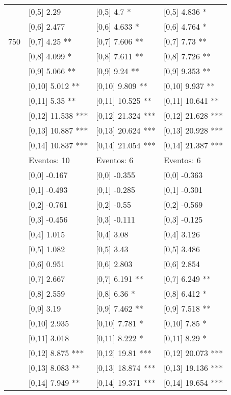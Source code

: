\begin{table}
\begin{tabular}[t]{llll}
 & {}[0,5] 2.29 & {}[0,5] 4.7 * & {}[0,5] 4.836 *\\
 & {}[0,6] 2.477 & {}[0,6] 4.633 * & {}[0,6] 4.764 *\\
750 & {}[0,7] 4.25 ** & {}[0,7] 7.606 ** & {}[0,7] 7.73 **\\
\addlinespace
 & {}[0,8] 4.099 * & {}[0,8] 7.611 ** & {}[0,8] 7.726 **\\
 & {}[0,9] 5.066 ** & {}[0,9] 9.24 ** & {}[0,9] 9.353 **\\
 & {}[0,10] 5.012 ** & {}[0,10] 9.809 ** & {}[0,10] 9.937 **\\
 & {}[0,11] 5.35 ** & {}[0,11] 10.525 ** & {}[0,11] 10.641 **\\
 & {}[0,12] 11.538 *** & {}[0,12] 21.324 *** & {}[0,12] 21.628 ***\\
\addlinespace
 & {}[0,13] 10.887 *** & {}[0,13] 20.624 *** & {}[0,13] 20.928 ***\\
 & {}[0,14] 10.837 *** & {}[0,14] 21.054 *** & {}[0,14] 21.387 ***\\
 & Eventos:  10 & Eventos:  6 & Eventos:  6\\
 & {}[0,0] -0.167 & {}[0,0] -0.355 & {}[0,0] -0.363\\
 & {}[0,1] -0.493 & {}[0,1] -0.285 & {}[0,1] -0.301\\
\addlinespace
 & {}[0,2] -0.761 & {}[0,2] -0.55 & {}[0,2] -0.569\\
 & {}[0,3] -0.456 & {}[0,3] -0.111 & {}[0,3] -0.125\\
 & {}[0,4] 1.015 & {}[0,4] 3.08 & {}[0,4] 3.126\\
 & {}[0,5] 1.082 & {}[0,5] 3.43 & {}[0,5] 3.486\\
 & {}[0,6] 0.951 & {}[0,6] 2.803 & {}[0,6] 2.854\\
\addlinespace
1000 & {}[0,7] 2.667 & {}[0,7] 6.191 ** & {}[0,7] 6.249 **\\
 & {}[0,8] 2.559 & {}[0,8] 6.36 * & {}[0,8] 6.412 *\\
 & {}[0,9] 3.19 & {}[0,9] 7.462 ** & {}[0,9] 7.518 **\\
 & {}[0,10] 2.935 & {}[0,10] 7.781 * & {}[0,10] 7.85 *\\
 & {}[0,11] 3.018 & {}[0,11] 8.222 * & {}[0,11] 8.29 *\\
\addlinespace
 & {}[0,12] 8.875 *** & {}[0,12] 19.81 *** & {}[0,12] 20.073 ***\\
 & {}[0,13] 8.083 ** & {}[0,13] 18.874 *** & {}[0,13] 19.136 ***\\
 & {}[0,14] 7.949 ** & {}[0,14] 19.371 *** & {}[0,14] 19.654 ***\\
\bottomrule
\end{tabular}
\end{table}
